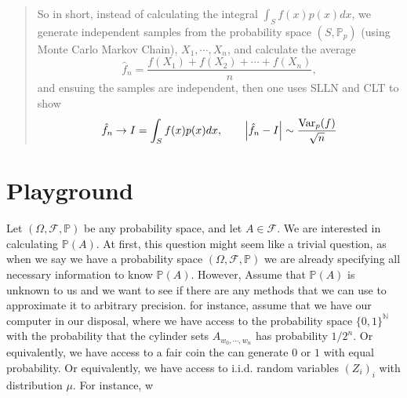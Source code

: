 \documentclass[11pt,a4paper]{article}
\theoremstyle{definition}
\theoremstyle{Example}
\newcommand{\Prob}{\mathbb{P}}
\newcommand{\set}[1]{\{#1\}}
\newcommand{\N}{\mathbb{N}}
\begin{document}
	\begin{quote}
		So in short, instead of calculating the integral $ \int_S f(x) p(x) dx $, we generate independent samples from the probability space $ (S,\Prob_p) $ (using Monte Carlo Markov Chain), $ X_1,\cdots,X_n $, and calculate the average
		\[ \hat{f}_n =  \frac{f(X_1)+f(X_2)+\cdots+f(X_n)}{n}, \]
		and ensuing the samples are independent, then one uses SLLN and CLT to show
		\[ \hat{f}_n \to I = \int_S f(x) p(x) dx, \qquad \abs{\hat{f}_n - I} \sim \frac{\operatorname{Var}_p(f)}{\sqrt{n}} \]
	\end{quote}
	
	
	
	\section{Playground}
	
	Let $ (\Omega,\mathcal{F},\Prob) $ be any probability space, and let $ A \in \mathcal{F} $. We are interested in calculating $ \Prob(A) $. At first, this question might seem like a trivial question, as when we say we have a probability space $ (\Omega, \mathcal{F},\Prob) $ we are already specifying all necessary information to know $ \Prob(A) $. However, Assume that $ \Prob(A) $ is unknown to us and we want to see if there are any methods that we can use to approximate it to arbitrary precision. for instance, assume that we have our computer in our disposal, where we have access to the probability space $ \set{0,1}^\N $ with the probability that the cylinder sets $ A_{w_0,\cdots,w_n} $ has probability $ 1/2^n $. Or equivalently, we have access to a fair coin the can generate $ 0 $ or $ 1 $ with equal probability. Or equivalently, we have access to i.i.d. random variables $ (Z_i)_i $ with distribution $ \mu $. For instance, w
	
	
	
\end{document}
